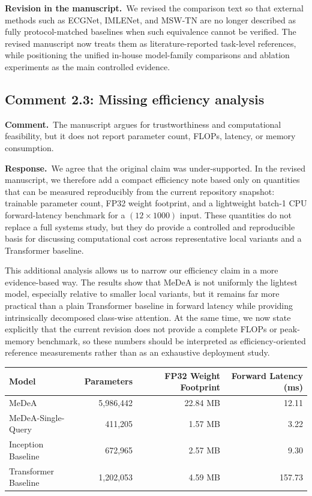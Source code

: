 \documentclass[11pt]{article}
\newcommand{\commentheader}{\textbf{Comment.}}
\newcommand{\responseheader}{\textbf{Response.}}
\newcommand{\revisionheader}{\textbf{Revision in the manuscript.}}
\begin{document}
\revisionheader\ We revised the comparison text so that external methods such as ECGNet, IMLENet, and MSW-TN are no longer described as fully protocol-matched baselines when such equivalence cannot be verified. The revised manuscript now treats them as literature-reported task-level references, while positioning the unified in-house model-family comparisons and ablation experiments as the main controlled evidence.

\subsection*{Comment 2.3: Missing efficiency analysis}

\commentheader\ The manuscript argues for trustworthiness and computational feasibility, but it does not report parameter count, FLOPs, latency, or memory consumption.

\responseheader\ We agree that the original claim was under-supported. In the revised manuscript, we therefore add a compact efficiency note based only on quantities that can be measured reproducibly from the current repository snapshot: trainable parameter count, FP32 weight footprint, and a lightweight batch-1 CPU forward-latency benchmark for a $(12 \times 1000)$ input. These quantities do not replace a full systems study, but they do provide a controlled and reproducible basis for discussing computational cost across representative local variants and a Transformer baseline.

This additional analysis allows us to narrow our efficiency claim in a more evidence-based way. The results show that MeDeA is not uniformly the lightest model, especially relative to smaller local variants, but it remains far more practical than a plain Transformer baseline in forward latency while providing intrinsically decomposed class-wise attention. At the same time, we now state explicitly that the current revision does not provide a complete FLOPs or peak-memory benchmark, so these numbers should be interpreted as efficiency-oriented reference measurements rather than as an exhaustive deployment study.

\begin{center}
\small
\begin{tabular}{lrrr}
\toprule
Model & Parameters & FP32 Weight Footprint & Forward Latency (ms) \\
\midrule
MeDeA & 5,986,442 & 22.84 MB & 12.11 \\
MeDeA-Single-Query & 411,205 & 1.57 MB & 3.22 \\
Inception Baseline & 672,965 & 2.57 MB & 9.30 \\
Transformer Baseline & 1,202,053 & 4.59 MB & 157.73 \\
\bottomrule
\end{tabular}
\end{center}
\end{document}
